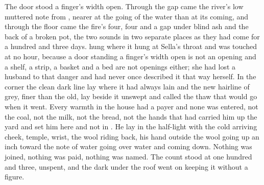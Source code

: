 \scenebreak

The door stood a finger's width open. Through the gap came the river's low muttered note from , nearer at the going of the water than at its coming, and through the floor came the fire's four, four and a gap under blind ash and the back of a broken pot, the two sounds in two separate places as they had come for a hundred and three days.  hung where it hung at Sella's throat and was touched at no hour, because a door standing a finger's width open is not an opening and a shelf, a strip, a basket and a bed are not openings either; she had lost a husband to that danger and had never once described it that way herself. In the corner the clean dark line lay where it had always lain and the new hairline of grey, finer than the old, lay beside it unswept and called the thaw that would go when it went. Every warmth in the house had a payer and none was entered, not the coal, not the milk, not the bread, not the hands that had carried him up the yard and set him here and not in . He lay in the half-light with the cold arriving cheek, temple, wrist, the wool riding back, his hand outside the wool going up an inch toward the note of water going over water and coming down. Nothing was joined, nothing was paid, nothing was named. The count stood at one hundred and three, unspent, and the dark under the roof went on keeping it without a figure.
